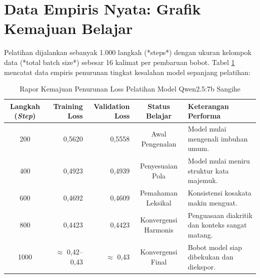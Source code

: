 \section{Data Empiris Nyata: Grafik Kemajuan Belajar}
Pelatihan dijalankan sebanyak 1.000 langkah (*steps*) dengan ukuran kelompok data (*total batch size*) sebesar 16 kalimat per pembaruan bobot. Tabel \ref{tab:loss_progress} mencatat data empiris penurunan tingkat kesalahan model sepanjang pelatihan:

\begin{table}[htbp]
\centering
\caption{Rapor Kemajuan Penurunan Loss Pelatihan Model Qwen2.5:7b Sangihe}
\label{tab:loss_progress}
\begin{tabularx}{\textwidth}{crrcX}
\toprule
\textbf{Langkah (\textit{Step})} & \textbf{Training Loss} & \textbf{Validation Loss} & \textbf{Status Belajar} & \textbf{Keterangan Performa} \\
\midrule
200 & 0,5620 & 0,5558 & Awal Pengenalan & Model mulai mengenali imbuhan umum. \\
400 & 0,4923 & 0,4939 & Penyesuaian Pola & Model mulai meniru struktur kata majemuk. \\
600 & 0,4692 & 0,4609 & Pemahaman Leksikal & Konsistensi kosakata makin menguat. \\
800 & 0,4423 & 0,4423 & Konvergensi Harmonis & Penguasaan diakritik dan konteks sangat matang. \\
1000 & $\approx$ 0,42--0,43 & $\approx$ 0,43 & Konvergensi Final & Bobot model siap dibekukan dan diekspor. \\
\bottomrule
\end{tabularx}
\end{table}

